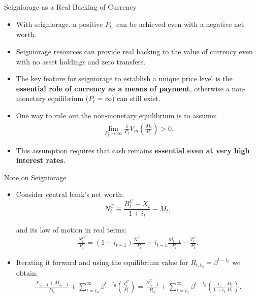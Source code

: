 \documentclass[11pt,aspectratio=169]{beamer}
\begin{document}
\begin{frame}{Seigniorage as a Real Backing of Currency}
\small

\begin{itemize}
    \item With seigniorage, a positive $P_{t_0}$ can be achieved even with a negative net worth. 
    \vspace{0.3em}

    \item Seigniorage resources can provide real backing to the value of currency even with no asset holdings and zero transfers. 
    \vspace{0.3em}

    \item The key feature for seigniorage to establish a unique price level is the \textbf{essential role of currency as a means of payment}, otherwise a non-monetary equilibrium ($P_t=   \infty$) can still exist. 
    \vspace{0.3em}

    \item One way to rule out the non-monetary equilibrium is to assume:
    \begin{align}
        \lim_{P_t \to \infty}
        \frac{1}{P_t}V_m\!\left( \frac{M_t}{P_t}\right) > 0.
        \label{2.24}
    \end{align}

    \item This assumption requires that cash remains \textbf{essential even at very high interest rates}.
\end{itemize}

\end{frame}

\begin{frame}{Note on Seigniorage}

\begin{itemize}
    \item Consider central bank's net worth:
    \begin{equation*}
 N_t^C \equiv \frac{B_t^C - X_t}{1 + i_t} - M_t,       
    \end{equation*} 
    
    and its law of motion in real terms:
\begin{align*}
    \frac{N_t^C}{P_t} = (1+i_{t-1})\frac{N_{t-1}^C}{P_{t}} + i_{t-1}\frac{M_{t-1}}{P_{t}} - \frac{T_t^C}{P_t}. 
\end{align*}
\item Iterating it forward and using the equilibrium value for $R_{t,t_0} = \beta^{t-t_0}$ we obtain: 
\begin{align}
\frac{X_{t_0-1}+M_{t_0-1}}{P_{t_0}}+\sum_{t= t_0}^\infty \beta^{t-t_0}\left(\frac{T_t^C}{P_t}\right)
= \frac{B_{t_0-1}^{C}}{P_{t_0}} + \sum_{t= t_0}^\infty \beta^{t-t_0}\left(\frac{i_t}{1+i_t}\frac{M_t}{P_t}\right). \label{cbequilibriumcondition}
\end{align}
\end{itemize}
\end{frame}
\end{document}

